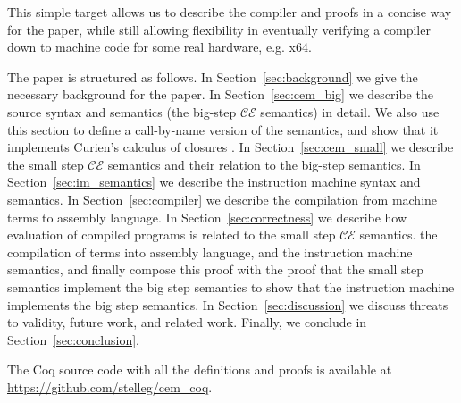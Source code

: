 This simple target allows us to describe the compiler and proofs in a concise
way for the paper, while still allowing flexibility in eventually verifying a
compiler down to machine code for some real hardware, e.g. x64.

The paper is structured as follows. In Section~\ref{sec:background} we give the
necessary background for the paper. In Section~\ref{sec:cem_big} we describe the
source syntax and semantics (the big-step $\mathcal{CE}$ semantics) in detail.
We also use this section to define a call-by-name version of the semantics, and
show that it implements Curien's calculus of closures \cite{curien}.  In
Section~\ref{sec:cem_small} we describe the small step $\mathcal{CE}$ semantics and
their relation to the big-step semantics. In
Section~\ref{sec:im_semantics} we describe the instruction machine syntax and
semantics. In Section~\ref{sec:compiler} we describe the compilation from
machine terms to assembly language. In Section~\ref{sec:correctness} we describe
how evaluation of compiled programs is related to the small step $\mathcal{CE}$
semantics. the compilation of terms into assembly language, and the instruction
machine semantics, and finally compose this proof with the proof that the
small step semantics implement the big step semantics to show that the
instruction machine implements the big step semantics. In
Section~\ref{sec:discussion} we discuss threats to validity, future work, and
related work. Finally, we conclude in Section~\ref{sec:conclusion}.

The Coq source code with all the definitions and proofs is available at
\url{https://github.com/stelleg/cem\_coq}. 
